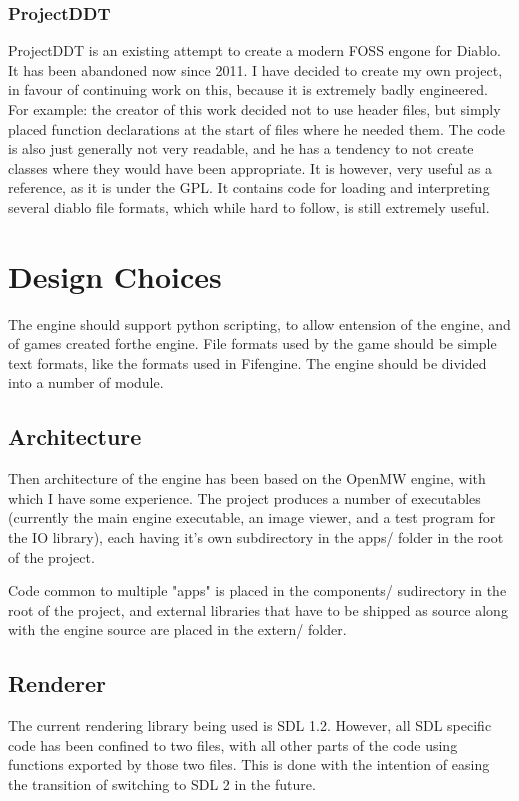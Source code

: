 \documentclass[a4paper]{article}
\begin{document}
    	\subsubsection{ProjectDDT}
    	ProjectDDT\cite{ddt} is an existing attempt to create a modern FOSS engone for Diablo.
    	It has been abandoned now since 2011.
    	I have decided to create my own project, in favour of continuing work on this, because it is extremely badly engineered.
    	For example: the creator of this work decided not to use header files, but simply placed function declarations at the start of files where he needed them.
    	The code is also just generally not very readable, and he has a tendency to not create classes where they would have been appropriate.
    	It is however, very useful as a reference, as it is under the GPL.
    	It contains code for loading and interpreting several diablo file formats, which while hard to follow, is still extremely useful.
  	\newpage
        
    \section{Design Choices}
    The engine should support python scripting, to allow entension of the engine, and of games created forthe engine.
    File formats used by the game should be simple text formats, like the formats used in Fifengine.
    The engine should be divided into a number of module.
    
    \subsection{Architecture}
    Then architecture of the engine has been based on the OpenMW\cite{openmw} engine, with which I have some experience.
    The project produces a number of executables (currently the main engine executable, an image viewer, and a test program for the IO library), each having it's own subdirectory in the apps/ folder in the root of the project.
    
    Code common to multiple "apps" is placed in the components/ sudirectory in the root of the project, and external libraries that have to be shipped as source along with the engine source are placed in the extern/ folder.
    
    \subsection{Renderer}
    The current rendering library being used is SDL 1.2. However, all SDL specific code has been confined to two files, with all other parts of the code using functions exported by those two files. This is done with the intention of easing the transition of switching to SDL 2 in the future.
    
\end{document}

